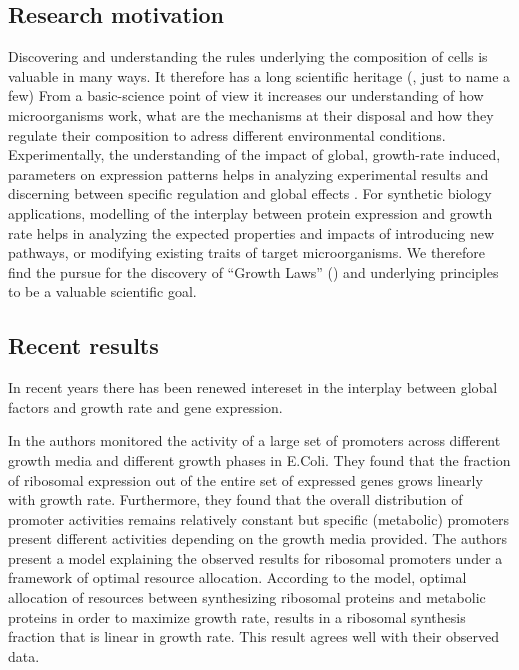 \documentclass{report}
\begin{document}
\subsection{Research motivation}
Discovering and understanding the rules underlying the composition of cells is valuable in many ways.
It therefore has a long scientific heritage (\cite{Schaechter1958, Maaloe1969, Bremer1987, Klumpp2009a}, just to name a few)
From a basic-science point of view it increases our understanding of how microorganisms work, what are the mechanisms at their disposal and how they regulate their composition to adress different environmental conditions.
Experimentally, the understanding of the impact of global, growth-rate induced, parameters on expression patterns helps in analyzing experimental results and discerning between specific regulation and global effects \cite{loven2012}.
For synthetic biology applications, modelling of the interplay between protein expression and growth rate helps in analyzing the expected properties and impacts of introducing new pathways, or modifying existing traits of target microorganisms.
We therefore find the pursue for the discovery of ``Growth Laws'' (\cite{Scott2010a}) and underlying principles to be a valuable scientific goal.
\subsection{Recent results}
In recent years there has been renewed intereset in the interplay between global factors and growth rate and gene expression.

In \cite{Zaslaver2009a} the authors monitored the activity of a large set of promoters across different growth media and different growth phases in E.Coli.
They found that the fraction of ribosomal expression out of the entire set of expressed genes grows linearly with growth rate.
Furthermore, they found that the overall distribution of promoter activities remains relatively constant but specific (metabolic) promoters present different activities depending on the growth media provided.
The authors present a model explaining the observed results for ribosomal promoters under a framework of optimal resource allocation.
According to the model, optimal allocation of resources between synthesizing ribosomal proteins and metabolic proteins in order to maximize growth rate, results in a ribosomal synthesis fraction that is linear in growth rate.
This result agrees well with their observed data.
\end{document}
